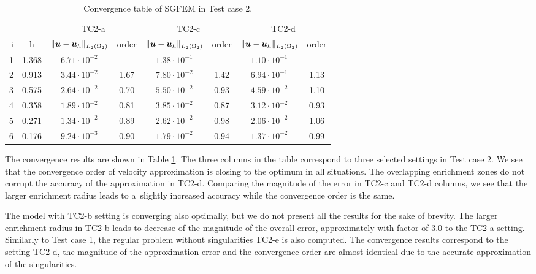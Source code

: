 \begin{table}[!htb]
\begin{center}
\bgroup
\def\arraystretch{1.2}
\setlength\tabcolsep{5pt}
\begin{tabular}{rc|cc|cc|cc}
\toprule
\multicolumn{2}{c|}{} & \multicolumn{2}{c|}{ TC2-a } & \multicolumn{2}{c|}{ TC2-c } & \multicolumn{2}{c}{TC2-d}\\ [3pt] %
i & h & $\|\mathbf{\boldsymbol{u}}-\mathbf{\boldsymbol{u}}_h\|_{L_2(\Omega_2)}$ & order & $\|\mathbf{\boldsymbol{u}}-\mathbf{\boldsymbol{u}}_h\|_{L_2(\Omega_2)}$
    & order & $\|\mathbf{\boldsymbol{u}}-\mathbf{\boldsymbol{u}}_h\|_{L_2(\Omega_2)}$ & order \\ [3pt] \midrule
1 & 1.368 &  $6.71\cdot10^{-2}$  &  -   &  $1.38\cdot10^{-1}$  &  -   &  $1.10\cdot10^{-1}$ &   -   \\
2 & 0.913 &  $3.44\cdot10^{-2}$  & 1.67 &  $7.80\cdot10^{-2}$  & 1.42 &  $6.94\cdot10^{-1}$ &  1.13 \\
3 & 0.575 &  $2.64\cdot10^{-2}$  & 0.70 &  $5.50\cdot10^{-2}$  & 0.93 &  $4.59\cdot10^{-2}$ &  1.10 \\
4 & 0.358 &  $1.89\cdot10^{-2}$  & 0.81 &  $3.85\cdot10^{-2}$  & 0.87 &  $3.12\cdot10^{-2}$ &  0.93 \\
5 & 0.271 &  $1.34\cdot10^{-2}$  & 0.89 &  $2.62\cdot10^{-2}$  & 0.98 &  $2.06\cdot10^{-2}$ &  1.06 \\
6 & 0.176 &  $9.24\cdot10^{-3}$  & 0.90 &  $1.79\cdot10^{-2}$  & 0.94 &  $1.37\cdot10^{-2}$ &  0.99 \\
\bottomrule
\end{tabular}
\caption{Convergence table of SGFEM in Test case 2.}
\label{tab:mh_tc2_convergence}
\egroup
\end{center}
\end{table}

The convergence results are shown in Table \ref{tab:mh_tc2_convergence}.
The three columns in the table correspond to three selected settings in Test case 2.
We see that the convergence order of velocity approximation is closing to the optimum in all situations.
The overlapping enrichment zones do not corrupt the accuracy of the approximation in TC2-d.
Comparing the magnitude of the error in TC2-c and TC2-d columns, we see that the larger enrichment radius leads
to a~slightly increased accuracy while the convergence order is the same.

The model with TC2-b setting is converging also optimally, but we do not present all the results for the sake of brevity.
The larger enrichment radius in TC2-b leads to decrease of the magnitude of the overall error,
approximately with factor of 3.0 to the TC2-a setting.
Similarly to Test case 1, the regular problem without singularities TC2-e is also computed.
The convergence results correspond to the setting TC2-d,
the magnitude of the approximation error and the convergence order are almost identical
due to the accurate approximation of the singularities.

